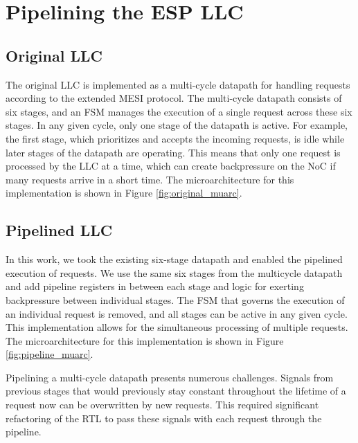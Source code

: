 \section{Pipelining the ESP LLC}
\label{sec:llcImplementations}
\subsection{Original LLC}
The original LLC is implemented as a multi-cycle datapath for handling requests
according to the extended MESI protocol. The multi-cycle datapath consists of
six stages, and an FSM manages the execution of a single request across these
six stages.  In any given cycle, only one stage of the datapath is active. For
example, the first stage, which prioritizes and accepts the incoming requests,
is idle while later stages of the datapath are operating. This means that only
one request is processed by the LLC at a time, which can create backpressure
on the NoC if many requests arrive in a short time. The microarchitecture for 
this implementation is shown in Figure \ref{fig:original_muarc}.
\subsection{Pipelined LLC}
In this work, we took the existing six-stage datapath and enabled the pipelined
execution of requests. We use the same six stages from the multicycle datapath
and add pipeline registers in between each stage and logic for exerting backpressure
between individual stages. The FSM that governs the execution of an individual request
is removed, and all stages can be active in any given cycle. This implementation allows
for the simultaneous processing of multiple requests. The microarchitecture for 
this implementation is shown in Figure \ref{fig:pipeline_muarc}.

\par Pipelining a multi-cycle datapath presents numerous challenges. Signals
from previous stages that would previously stay constant throughout the
lifetime of a request now can be overwritten by new requests. This required
significant refactoring of the RTL to pass these signals with each request
through the pipeline.

